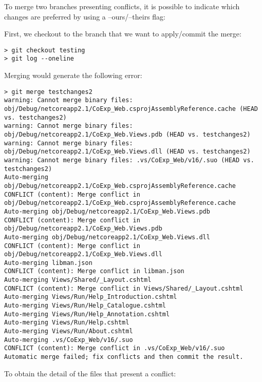 \documentclass[]{book}
\begin{document}
To merge two branches presenting conflicts, it is possible to indicate
which changes are preferred by using a --ours/--theirs flag:

First, we checkout to the branch that we want to apply/commit the merge:

\begin{verbatim}
> git checkout testing
> git log --oneline
\end{verbatim}

Merging would generate the following error:

\begin{verbatim}
> git merge testchanges2
warning: Cannot merge binary files: obj/Debug/netcoreapp2.1/CoExp_Web.csprojAssemblyReference.cache (HEAD vs. testchanges2)
warning: Cannot merge binary files: obj/Debug/netcoreapp2.1/CoExp_Web.Views.pdb (HEAD vs. testchanges2)
warning: Cannot merge binary files: obj/Debug/netcoreapp2.1/CoExp_Web.Views.dll (HEAD vs. testchanges2)
warning: Cannot merge binary files: .vs/CoExp_Web/v16/.suo (HEAD vs. testchanges2)
Auto-merging obj/Debug/netcoreapp2.1/CoExp_Web.csprojAssemblyReference.cache
CONFLICT (content): Merge conflict in obj/Debug/netcoreapp2.1/CoExp_Web.csprojAssemblyReference.cache
Auto-merging obj/Debug/netcoreapp2.1/CoExp_Web.Views.pdb
CONFLICT (content): Merge conflict in obj/Debug/netcoreapp2.1/CoExp_Web.Views.pdb
Auto-merging obj/Debug/netcoreapp2.1/CoExp_Web.Views.dll
CONFLICT (content): Merge conflict in obj/Debug/netcoreapp2.1/CoExp_Web.Views.dll
Auto-merging libman.json
CONFLICT (content): Merge conflict in libman.json
Auto-merging Views/Shared/_Layout.cshtml
CONFLICT (content): Merge conflict in Views/Shared/_Layout.cshtml
Auto-merging Views/Run/Help_Introduction.cshtml
Auto-merging Views/Run/Help_Catalogue.cshtml
Auto-merging Views/Run/Help_Annotation.cshtml
Auto-merging Views/Run/Help.cshtml
Auto-merging Views/Run/About.cshtml
Auto-merging .vs/CoExp_Web/v16/.suo
CONFLICT (content): Merge conflict in .vs/CoExp_Web/v16/.suo
Automatic merge failed; fix conflicts and then commit the result.
\end{verbatim}

To obtain the detail of the files that present a conflict:
\end{document}
